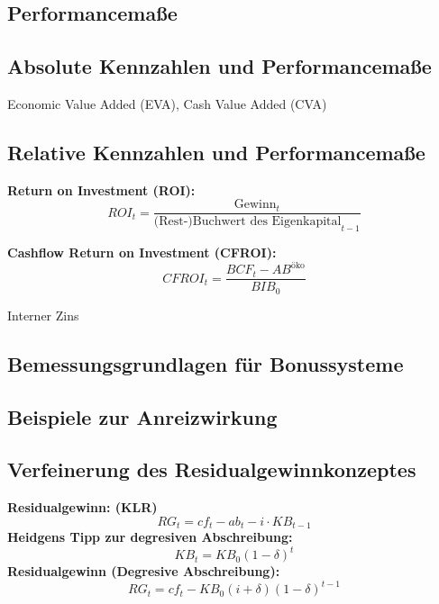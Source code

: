 \documentclass[leqno]{scrartcl}
\begin{document}
\begin{multicols}{4}
\section{Performancemaße}


\subsection{Absolute Kennzahlen und Performancemaße}
Economic Value Added (EVA), Cash Value Added (CVA)



\subsection{Relative Kennzahlen und Performancemaße}

\textbf{Return on Investment (ROI):}
  \begin{equation*}
    ROI_t = \frac{\text{Gewinn}_t}{\text{(Rest-)Buchwert des Eigenkapital}_{t-1}}
  \end{equation*}
  
\textbf{Cashflow Return on Investment (CFROI):}
  \begin{equation*}
    CFROI_t = \frac{BCF_t-AB^{\text{öko}}}{BIB_0}
  \end{equation*}
  
  Interner Zins



\subsection{Bemessungsgrundlagen für Bonussysteme}
\subsection{Beispiele zur Anreizwirkung}
\subsection{Verfeinerung des Residualgewinnkonzeptes}

\textbf{Residualgewinn: (KLR)}
  \begin{equation*}
    RG_t = cf_t - ab_t - i\cdot KB_{t-1}
  \end{equation*}
\textbf{Heidgens Tipp zur degresiven Abschreibung:}
  \begin{equation*}
    KB_t = KB_0(1-\delta)^t
  \end{equation*}
\textbf{Residualgewinn (Degresive Abschreibung):}
  \begin{equation*}
    RG_t = cf_t - KB_0(i+\delta)(1-\delta)^{t-1}
  \end{equation*}


\end{multicols}
\end{document}
